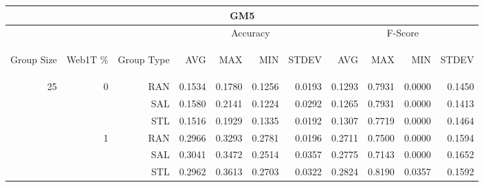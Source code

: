 \begin{center}
\begin{table}[htbp] 
 \begin{center}
\begin{tabular}{ | r | r | r | r | r | r | r | r | r | r | r |}
\hline
\multicolumn{11}{|c|}{GM5}\\
\hline
 & & & \multicolumn{4}{|c|}{Accuracy} & \multicolumn{4}{|c|}{F-Score}\\ \cline{4-11}
\begin{sideways}Group Size\end{sideways} & \begin{sideways}Web1T \%\end{sideways} & \begin{sideways}Group Type\end{sideways} & \begin{sideways}AVG\end{sideways} & \begin{sideways}MAX\end{sideways} & \begin{sideways}MIN\end{sideways} & \begin{sideways}STDEV\end{sideways} & \begin{sideways}AVG\end{sideways} & \begin{sideways}MAX\end{sideways} & \begin{sideways}MIN\end{sideways} & \begin{sideways}STDEV\end{sideways}\\
\hline
\multirow{18}{*}{25}
 & \multirow{3}{*}{0} & RAN & 0.1534 & 0.1780 & 0.1256 & 0.0193 & 0.1293 & 0.7931 & 0.0000 & 0.1450\\ \cline{3-11}
 &   & SAL & 0.1580 & 0.2141 & 0.1224 & 0.0292 & 0.1265 & 0.7931 & 0.0000 & 0.1413\\ \cline{3-11}
 &   & STL & 0.1516 & 0.1929 & 0.1335 & 0.0192 & 0.1307 & 0.7719 & 0.0000 & 0.1464\\ \cline{2-11}
 & \multirow{3}{*}{1} & RAN & 0.2966 & 0.3293 & 0.2781 & 0.0196 & 0.2711 & 0.7500 & 0.0000 & 0.1594\\ \cline{3-11}
 &   & SAL & 0.3041 & 0.3472 & 0.2514 & 0.0357 & 0.2775 & 0.7143 & 0.0000 & 0.1652\\ \cline{3-11}
 &   & STL & 0.2962 & 0.3613 & 0.2703 & 0.0322 & 0.2824 & 0.8190 & 0.0357 & 0.1592\\ \cline{2-11}

\end{tabular}
\end{center}
\end{table}
\end{center}

